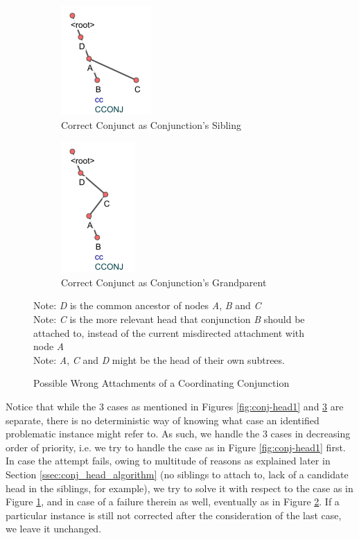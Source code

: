 \begin{figure}[H]
\begin{subfigure}{.45\textwidth}
  \centering
  \includegraphics{img/nested2.png}
  \caption{Correct Conjunct as Conjunction's Sibling}
  \label{fig:conj-head2}
  \end{subfigure}
\begin{subfigure}{.5\textwidth}
  \centering
  \includegraphics{img/nested3.png}
  \caption{Correct Conjunct as Conjunction's Grandparent}
  \label{fig:conj-head3}
\end{subfigure}
\caption[Possible Wrong Attachments of a Coordinating Conjunction]{Possible Wrong Attachments of a Coordinating Conjunction}
    Note: \textit{D} is the common ancestor of nodes \textit{A}, \textit{B} and \textit{C}\\
    Note: \textit{C} is the more relevant head that conjunction \textit{B} should be attached to, instead of the current misdirected attachment with node \textit{A}\\
    Note: \textit{A}, \textit{C} and \textit{D} might be the head of their own subtrees.
\label{fig:conj-head23}
\end{figure}

Notice that while the 3 cases as mentioned in Figures \ref{fig:conj-head1} and \ref{fig:conj-head23} are separate, there is no deterministic way of knowing what case an identified problematic instance might refer to. As such, we handle the 3 cases in decreasing order of priority, i.e. we try to handle the case as in Figure \ref{fig:conj-head1} first. In case the attempt fails, owing to multitude of reasons as explained later in Section \ref{ssec:conj_head_algorithm} (no siblings to attach to, lack of a candidate head in the siblings, for example), we try to solve it with respect to the case as in Figure \ref{fig:conj-head2}, and in case of a failure therein as well, eventually as in Figure \ref{fig:conj-head3}. If a particular instance is still not corrected after the consideration of the last case, we leave it unchanged.

